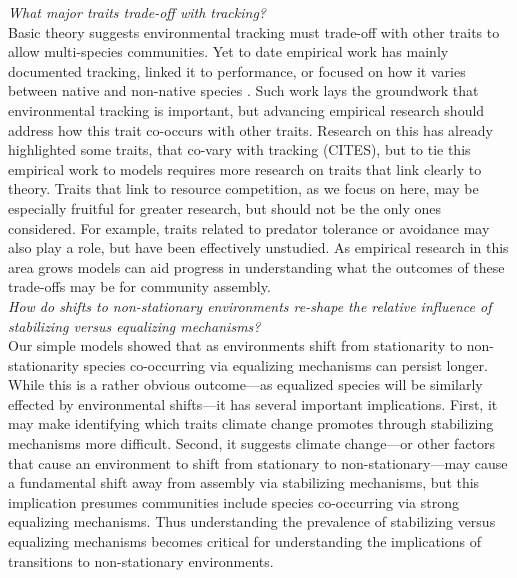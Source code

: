 \documentclass[11pt,letterpaper]{article}
\begin{document}
\emph{What major traits trade-off with tracking?} \\

Basic theory suggests environmental tracking must trade-off with other traits to allow multi-species communities. Yet to date empirical work has mainly documented tracking, linked it to performance, or focused on how it varies between native and non-native species \citep{Willis:2010al,wolkovichAmBot2013,Zettlemoyer2019}. Such work lays the groundwork that environmental tracking is important, but advancing empirical research should address how this trait co-occurs with other traits. Research on this has already highlighted some traits, that co-vary with tracking (CITES), but to tie this empirical work to models requires more research on traits that link clearly to theory. Traits that link to resource competition, as we focus on here, may be especially fruitful for greater research, but should not be the only ones considered. For example, traits related to predator tolerance or avoidance may also play a role, but have been effectively unstudied.  As empirical research in this area grows models can aid progress in understanding what the outcomes of these trade-offs may be for community assembly.\\ 

\emph{How do shifts to non-stationary environments re-shape the relative influence of stabilizing versus equalizing mechanisms?} \\

Our simple models showed that as environments shift from stationarity to non-stationarity species co-occurring via equalizing mechanisms can persist longer. While this is a rather obvious outcome---as equalized species will be similarly effected by environmental shifts---it has several important implications. First, it may make identifying which traits climate change promotes through stabilizing mechanisms more difficult. Second, it suggests climate change---or other factors that cause an environment to shift from stationary to non-stationary---may cause a fundamental shift away from assembly via stabilizing mechanisms, but this implication presumes communities include species co-occurring via strong equalizing mechanisms. Thus understanding the prevalence of stabilizing versus equalizing mechanisms \citep[which ecology has worked on for many decades,][]{Caswell:1976np,Gravel:2006ax,Chesson:2000vd} becomes critical for understanding the implications of transitions to non-stationary environments. 
\end{document}
